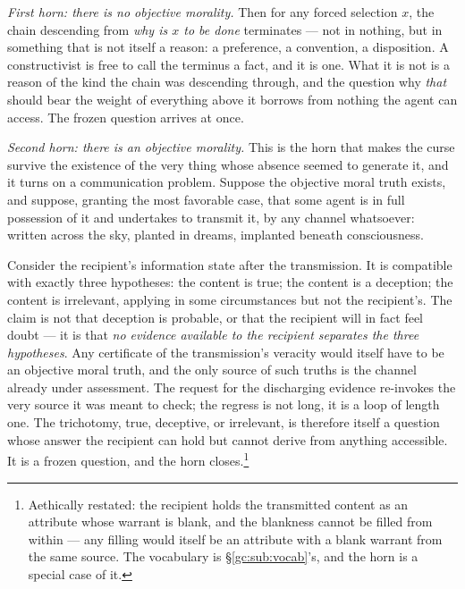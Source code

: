 \documentclass[11pt]{article}
\numberwithin{equation}{section}
\theoremstyle{plain}
\theoremstyle{definition}
\theoremstyle{remark}
\begin{document}
\emph{First horn: there is no objective morality.} Then for any forced selection $x$, the chain descending from \emph{why is $x$ to be done} terminates --- not in nothing, but in something that is not itself a reason: a preference, a convention, a disposition. A constructivist is free to call the terminus a fact, and it is one. What it is not is a reason of the kind the chain was descending through, and the question why \emph{that} should bear the weight of everything above it borrows from nothing the agent can access. The frozen question arrives at once.

\emph{Second horn: there is an objective morality.} This is the horn that makes the curse survive the existence of the very thing whose absence seemed to generate it, and it turns on a communication problem. Suppose the objective moral truth exists, and suppose, granting the most favorable case, that some agent is in full possession of it and undertakes to transmit it, by any channel whatsoever: written across the sky, planted in dreams, implanted beneath consciousness.

Consider the recipient's information state after the transmission. It is compatible with exactly three hypotheses: the content is true; the content is a deception; the content is irrelevant, applying in some circumstances but not the recipient's. The claim is not that deception is probable, or that the recipient will in fact feel doubt --- it is that \emph{no evidence available to the recipient separates the three hypotheses}. Any certificate of the transmission's veracity would itself have to be an objective moral truth, and the only source of such truths is the channel already under assessment. The request for the discharging evidence re-invokes the very source it was meant to check; the regress is not long, it is a loop of length one. The trichotomy, true, deceptive, or irrelevant, is therefore itself a question whose answer the recipient can hold but cannot derive from anything accessible. It is a frozen question, and the horn closes.\footnote{Aethically restated: the recipient holds the transmitted content as an attribute whose warrant is blank, and the blankness cannot be filled from within --- any filling would itself be an attribute with a blank warrant from the same source. The vocabulary is \S\ref{gc:sub:vocab}'s, and the horn is a special case of it.}%
\end{document}
